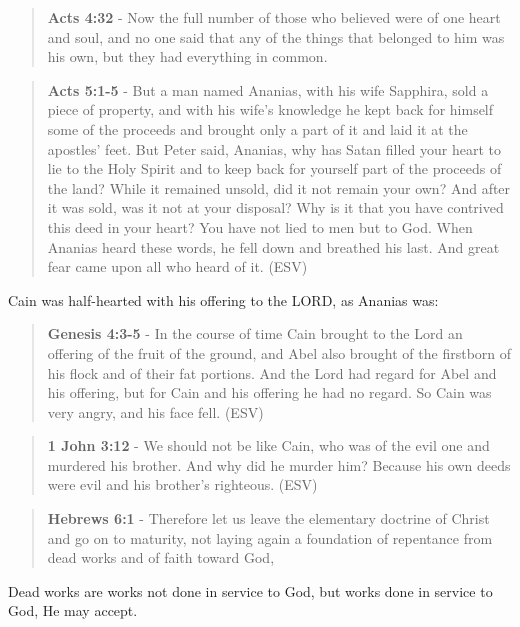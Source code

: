\documentclass[11pt]{article}
\begin{document}
\begin{quote}
\textbf{Acts 4:32} - Now the full number of those who believed were of one heart and soul, and no one said that any of the things that belonged to him was his own, but they had everything in common.
\end{quote}

\begin{quote}
\textbf{Acts 5:1-5} -  But a man named Ananias, with his wife Sapphira, sold a piece of property, and with his wife's knowledge he kept back for himself some of the proceeds and brought only a part of it and laid it at the apostles' feet.  But Peter said, Ananias, why has Satan filled your heart to lie to the Holy Spirit and to keep back for yourself part of the proceeds of the land?  While it remained unsold, did it not remain your own?  And after it was sold, was it not at your disposal?  Why is it that you have contrived this deed in your heart?  You have not lied to men but to God.  When Ananias heard these words, he fell down and breathed his last.  And great fear came upon all who heard of it.  (ESV)
\end{quote}

Cain was half-hearted with his offering to the LORD, as Ananias was:

\begin{quote}
\textbf{Genesis 4:3-5} - In the course of time Cain brought to the Lord an offering of the fruit of the ground, and Abel also brought of the firstborn of his flock and of their fat portions. And the Lord had regard for Abel and his offering, but for Cain and his offering he had no regard. So Cain was very angry, and his face fell. (ESV)
\end{quote}

\begin{quote}
\textbf{1 John 3:12} - We should not be like Cain, who was of the evil one and murdered his brother. And why did he murder him? Because his own deeds were evil and his brother's righteous. (ESV)
\end{quote}

\begin{quote}
\textbf{Hebrews 6:1} - Therefore let us leave the elementary doctrine of Christ and go on to maturity, not laying again a foundation of repentance from dead works and of faith toward God,
\end{quote}

Dead works are works not done in service to God, but works done in service to God, He may accept.
\end{document}
